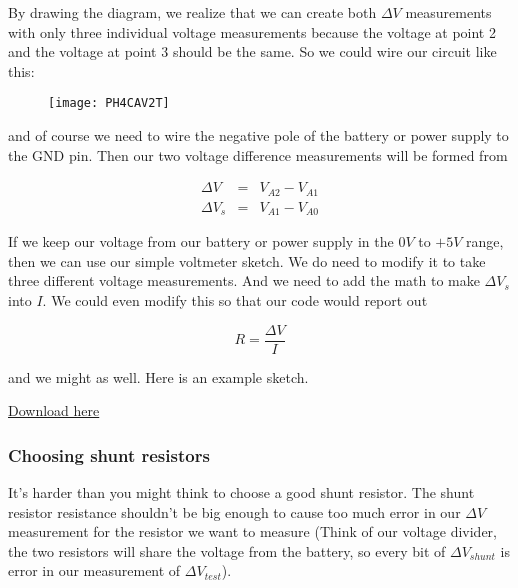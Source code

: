 By drawing the diagram, we realize that we can create both $\Delta V$ measurements with only three individual voltage measurements because the voltage at point 2 and the voltage at point 3 should be the same. So we could wire our circuit like this:

\begin{figure}[h!]
		\centering
	\texttt{[image: PH4CAV2T]}
\end{figure}

\noindent and of course we need to wire the negative pole of the battery or power supply to the GND pin. Then our two voltage difference measurements will be formed from 

\begin{eqnarray*}
	\Delta V &=&V_{A2}-V_{A1} \\
	\Delta V_{s} &=&V_{A1}-V_{A0}
\end{eqnarray*}

If we keep our voltage from our battery or power supply in the $0\unit{V}$ to $+5\unit{V}$ range, then we can use our simple voltmeter sketch. We do need to modify it to take three different voltage measurements. And we need to add the math to make $\Delta V_{s}$ into $I.$ We could even modify this so that our code would report out 

\begin{equation*}
	R=\frac{\Delta V}{I}
\end{equation*}

\noindent and we might as well. Here is an example sketch.

\href{https://raw.githubusercontent.com/rtlines/IntermediateLabPH250/main/Code/OhmsLaw_SimpleVA.ino}{Download here}


\subsubsection{Choosing shunt resistors}

It's harder than you might think to choose a good shunt resistor. The shunt resistor resistance shouldn't be big enough to cause too much error in our $\Delta V$ measurement for the resistor we want to measure (Think of our voltage divider, the two resistors will share the voltage from the battery, so every bit of $\Delta V_{shunt}$ is error in our measurement of $\Delta V_{test}$).

